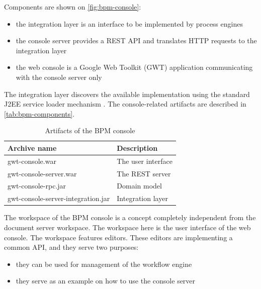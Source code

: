 Components are shown on \autoref{fig:bpm-console}:

\begin{itemize}
\item the integration layer is an interface to be implemented by process engines
\item the console server provides a REST API and translates HTTP requests to the integration layer
\item the web console is a Google Web Toolkit (GWT) application communicating with the console server only
\end{itemize}

The integration layer discovers the available implementation using the standard
J2EE service loader mechanism \cite{service-loader}. The console-related
artifacts are described in \autoref{tab:bpm-components}.

\begin{table}[H]
  \begin{center}
    \begin{tabular}{| l | l |}
    \hline
    \textbf{Archive name} & \textbf{Description} \\ \hline
    gwt-console.war & The user interface \\ \hline
    gwt-console-server.war & The REST server \\ \hline
    gwt-console-rpc.jar & Domain model \\ \hline
    gwt-console-server-integration.jar & Integration layer \\ \hline
    \end{tabular}
  \end{center}
  \caption{Artifacts of the BPM console}
  \label{tab:bpm-components}
\end{table}


The workspace of the BPM console is a concept completely independent from the
document server workspace. The workspace here is the user interface of the web
console. The workspace features editors. These editors are implementing a
common API, and they serve two purposes:

\begin{itemize}
\item they can be used for management of the workflow engine
\item they serve as an example on how to use the console server
\end{itemize}

